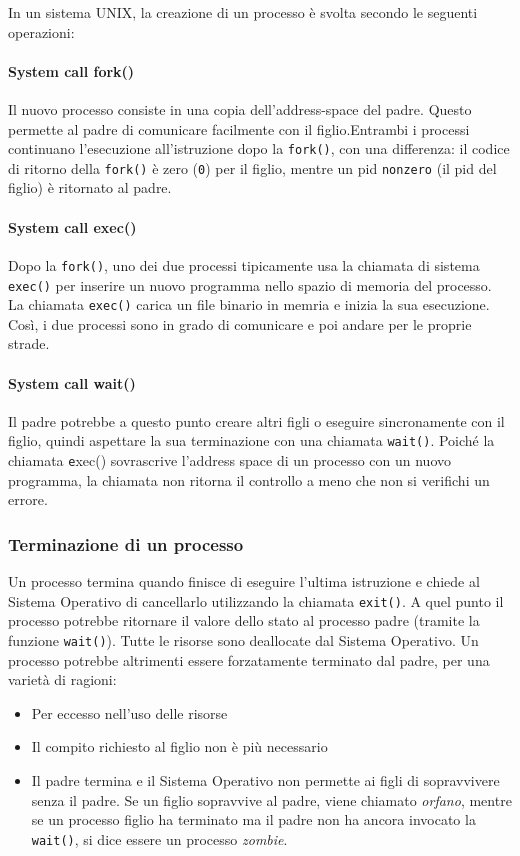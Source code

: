 \documentclass[a4]{article}
\begin{document}
In un sistema UNIX, la creazione di un processo è svolta secondo le seguenti operazioni:

\paragraph{System call fork()} Il nuovo processo consiste in una copia dell'address-space del padre. Questo permette al padre di comunicare facilmente con il figlio.Entrambi i processi continuano l'esecuzione all'istruzione dopo la \texttt{fork()}, con una differenza: il codice di ritorno della \texttt{fork()} è zero (\texttt{0}) per il figlio, mentre un pid \texttt{nonzero} (il pid del figlio) è ritornato al padre.
\paragraph{System call exec()} Dopo la \texttt{fork()}, uno dei due processi tipicamente usa la chiamata di sistema \texttt{exec()} per inserire un nuovo programma nello spazio di memoria del processo. La chiamata \texttt{exec()} carica un file binario in memria e inizia la sua esecuzione. Così, i due processi sono in grado di comunicare e poi andare per le proprie strade.
\paragraph{System call wait()} Il padre potrebbe a questo punto creare altri figli o eseguire sincronamente con il figlio, quindi aspettare la sua terminazione con una chiamata \texttt{wait()}. \newline
Poiché la chiamata \texttt exec() sovrascrive l'address space di un processo con un nuovo programma, la chiamata non ritorna il controllo a meno che non si verifichi un errore.

\subsubsection{Terminazione di un processo}
Un processo termina quando finisce di eseguire l'ultima istruzione e chiede al Sistema Operativo di cancellarlo utilizzando la chiamata \texttt{exit()}. A quel punto il processo potrebbe ritornare il valore dello stato al processo padre (tramite la funzione \texttt{wait()}). Tutte le risorse sono deallocate dal Sistema Operativo. \newline
Un processo potrebbe altrimenti essere forzatamente terminato dal padre, per una varietà di ragioni:
\begin{itemize}
    \item Per eccesso nell'uso delle risorse
    \item Il compito richiesto al figlio non è più necessario
    \item Il padre termina e il Sistema Operativo non permette ai figli di sopravvivere senza il padre. Se un figlio sopravvive al padre, viene chiamato \textit{orfano}, mentre se un processo figlio ha terminato ma il padre non ha ancora invocato la \texttt{wait()}, si dice essere un processo \textit{zombie}.
\end{itemize}
\end{document}
